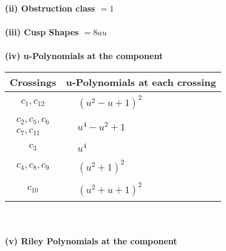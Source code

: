 \documentclass[1p]{elsarticle_modified}
\theoremstyle{definition}
\begin{document}
\flushleft \textbf{(ii) Obstruction class $= 1$}\\~\\
\flushleft \textbf{(iii) Cusp Shapes $= 8 a u$}\\~\\
\newpage\renewcommand{\arraystretch}{1}
\flushleft \textbf{(iv) u-Polynomials at the component}\newline \\
\begin{tabular}{m{50pt}|m{274pt}}
Crossings & \hspace{64pt}u-Polynomials at each crossing \\
\hline $$\begin{aligned}c_{1},c_{12}\end{aligned}$$&$\begin{aligned}
&(u^2- u+1)^2
\end{aligned}$\\
\hline $$\begin{aligned}c_{2},c_{5},c_{6}\\c_{7},c_{11}\end{aligned}$$&$\begin{aligned}
&u^4- u^2+1
\end{aligned}$\\
\hline $$\begin{aligned}c_{3}\end{aligned}$$&$\begin{aligned}
&u^4
\end{aligned}$\\
\hline $$\begin{aligned}c_{4},c_{8},c_{9}\end{aligned}$$&$\begin{aligned}
&(u^2+1)^2
\end{aligned}$\\
\hline $$\begin{aligned}c_{10}\end{aligned}$$&$\begin{aligned}
&(u^2+u+1)^2
\end{aligned}$\\
\hline
\end{tabular}\\~\\
\newpage\renewcommand{\arraystretch}{1}
\flushleft \textbf{(v) Riley Polynomials at the component}\newline \\
\end{document}
